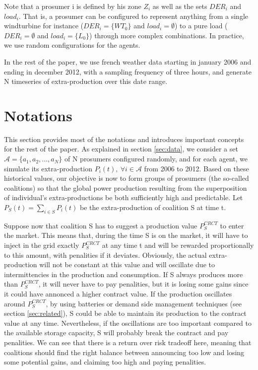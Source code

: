 \documentclass[conference]{IEEEtran}
\begin{document}
Note that a prosumer i is defined by his zone $ Z_{i} $ as well as the sets $ DER_{i} $ and $ load_{i} $. That is, a prosumer can be configured to represent anything from a single windturbine for instance ($ DER_{i} = \{ WT_{0} \} $ and $ load_{i} = \emptyset $) to a pure load ($ DER_{i} = \emptyset $ and $ load_{i} = \{ L_{0} \} $) through more complex combinations. In practice, we use random configurations for the agents.

In the rest of the paper, we use french weather data \cite{Infoclimat} starting in january 2006 and ending in december 2012, with a sampling frequency of three hours, and generate N timeseries of extra-production over this date range.



%
%

\section{Notations}
\label{sec:notations}

This section provides most of the notations and introduces important concepts for the rest of the paper. As explained in section \ref{sec:data}, we consider a set $ \mathcal{A} = \{a_{1},a_{2},...,a_{N} \} $ of N prosumers configured randomly, and for each agent, we simulate its extra-production $ P_{i}(t),\ \forall i \in \mathcal{A} $ from 2006 to 2012. Based on these historical values, our objective is now to form groups of prosumers (the so-called coalitions) so that the global power production resulting from the superposition of individual's extra-productions be both sufficiently high and predictable. Let $ P_{S}(t) = \sum_{i \in S} P_{i}(t) $ be the extra-production of coalition S at time t. 

Suppose now that coalition S has to suggest a production value $ P_{S}^{CRCT} $ to enter the market. This means that, during the time S is on the market, it will have to inject in the grid exactly $ P_{S}^{CRCT} $ at any time t and will be rewarded proportionally to this amount, with penalities if it deviates. Obviously, the actual extra-production will not be constant at this value and will oscillate due to intermittencies in the production and consumption. If S always produces more than $ P_{S}^{CRCT} $, it will never have to pay penalities, but it is losing some gains since it could have annonced a higher contract value. If the production oscillates around $ P_{S}^{CRCT} $, by using batteries or demand side management techniques (see section \ref{sec:related}), S could be able to maintain its production to the contract value at any time. Nevertheless, if the oscillations are too important compared to the available storage capacity, S will probably break the contract and pay penalities. We can see that there is a return over risk tradeoff here, meaning that coalitions should find the right balance between announcing too low and losing some potential gains, and claiming too high and paying penalities. 
\end{document}
